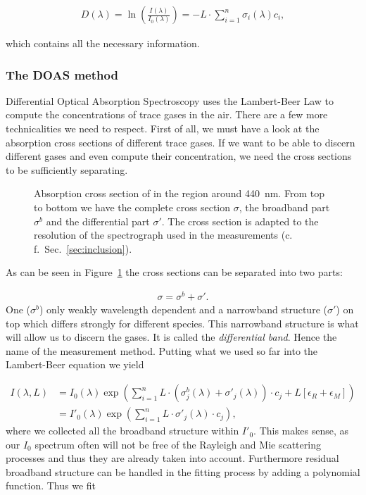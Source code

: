 \begin{align*}
  D(\lambda) = \ln \left(\frac{I(\lambda)}{I_0(\lambda)}\right) = - L
  \cdot \sum_{i=1}^n \sigma_i(\lambda) c_i,
\end{align*}

which contains all the necessary information.

\subsubsection{The DOAS method}
\label{sec:doas}

Differential Optical Absorption Spectroscopy uses the Lambert-Beer Law
to compute the concentrations of trace gases in the air. There are a
few more technicalities we need to respect. First of all, we must have
a look at the absorption cross sections of different trace gases. If we
want to be able to discern different gases and even compute their
concentration, we need the cross sections to be sufficiently
separating.

\begin{figure}[htbp]
  \centering
  
  \caption{Absorption cross section of  in the region around
    \SI{440}{\nano\meter}. From top to bottom we have the complete
    cross section $\sigma$, the broadband part $\sigma^b$ and the
    differential part $\sigma'$. The cross section is adapted to the
    resolution of the spectrograph used in the measurements
    (c.\,f.\ Sec.~\ref{sec:inclusion}).}
  \label{fig:no2-cross}
\end{figure}

As can be seen in Figure~\ref{fig:no2-cross} the
cross sections can be separated into two parts: 

\begin{align*}
  \sigma = \sigma^b + \sigma'.
\end{align*}
One ($\sigma^b$) only weakly
wavelength dependent and a narrowband
structure ($\sigma'$) on top which differs strongly for different species. This
narrowband structure is what will allow us to discern the gases. It is
called the \emph{differential band}. Hence the name of the measurement
method. Putting what we used so far into the Lambert-Beer equation we
yield

\begin{align*}
  I(\lambda, L) & = I_0(\lambda) \exp \left ( \sum_{i=1}^n L \cdot
                  (\sigma^b_j(\lambda) + \sigma'_j(\lambda))\cdot c_j + L[\epsilon_R +
                  \epsilon_M]\right) \\
                & = I'_0(\lambda) \exp \left( \sum_{i=1}^n L \cdot
                  \sigma'_j(\lambda) \cdot c_j \right),
\end{align*}
where we collected all the broadband structure within $I'_0$. This
makes sense, as our $I_0$ spectrum often will not be free of the Rayleigh
and Mie scattering processes and thus they are already taken into
account. Furthermore residual broadband structure can be handled in
the fitting process by adding a polynomial function. Thus we fit

